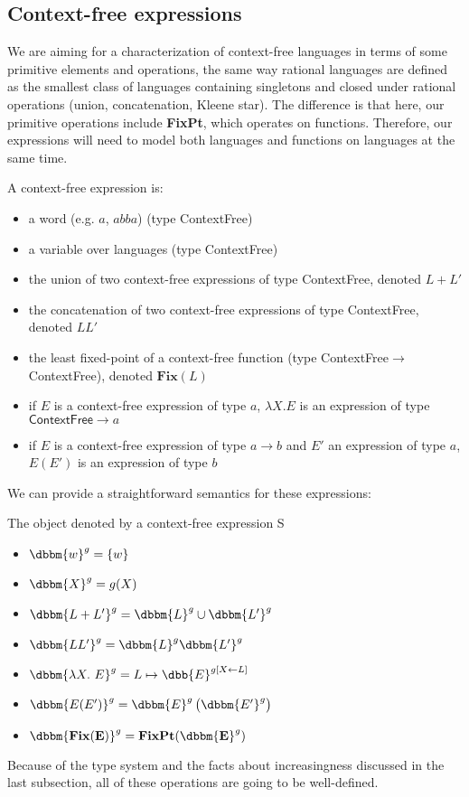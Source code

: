 \subsection{Context-free expressions}

We are aiming for a characterization of context-free languages in terms of some primitive elements and operations, the same way rational languages are defined as the smallest class of languages containing singletons and closed under rational operations (union, concatenation, Kleene star). The difference is that here, our primitive operations include \textbf{FixPt}, which operates on functions. Therefore, our expressions will need to model both languages and functions on languages at the same time.

\begin{definition}
A context-free expression is:
\begin{itemize}
\item a word (e.g. $a$, $abba$) (type \textsf{ContextFree})
\item a variable over languages (type \textsf{ContextFree})
\item the union of two context-free expressions of type \textsf{ContextFree},  denoted $L + L'$
\item the concatenation of two context-free expressions of type \textsf{ContextFree}, denoted $LL'$
\item the least fixed-point of a context-free function (type \textsf{ContextFree}$\rightarrow$\textsf{ContextFree}), denoted $\mathbf{Fix}(L)$
\item if $E$ is a context-free expression of type $a$, $\lambda X. E$ is an expression of type $\textsf{ContextFree}\rightarrow a$
\item if $E$ is a context-free expression of type $a\rightarrow b$ and $E'$ an expression of type $a$, $E(E')$ is an expression of type $b$
\end{itemize}
\end{definition}

We can provide a straightforward semantics for these expressions:

\begin{definition}
The object denoted by a context-free expression S
\begin{itemize}
\item $\dbbm{w}^{g} = \left\lbrace w\right\rbrace$
\item $\dbbm{X}^{g} = g(X)$
\item $\dbbm{L + L'}^{g} = \dbbm{L}^{g} \cup\dbbm{L'}^{g} $
\item $\dbbm{LL'}^{g} = \dbbm{L}^{g} \dbbm{L'}^{g} $
\item $\dbbm{\lambda X.\ E}^{g} = L\mapsto \dbb{E}^{g[X\leftarrow L]} $
\item $\dbbm{E(E')}^{g} = \dbbm{E}^{g}\left( \dbbm{E'}^{g}\right) $
\item $\dbbm{\mathbf{Fix(E)}}^{g} = \mathbf{FixPt}(\dbbm{\mathbf{E}}^{g}) $
\end{itemize}
\end{definition}
%
Because of the type system and the facts about increasingness discussed in the last subsection, all of these operations are going to be well-defined.

